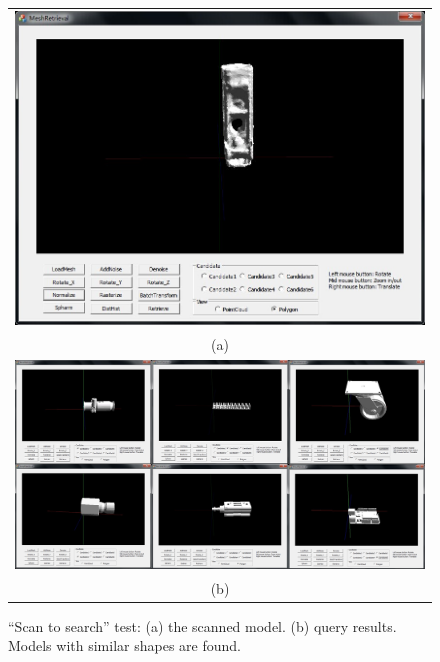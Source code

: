 \begin{figure}
\begin{center}
\begin{tabular}{c}   %
   \includegraphics[height=0.4\columnwidth]{input_component_scantosearch_test}\\
   (a)\\
   \includegraphics[width=0.95\linewidth]{output_component_scantosearch_test}  \\
   (b)\\
\end{tabular}
\caption{``Scan to search'' test: (a) the scanned model. (b) query results.  Models with similar shapes are found. } 
  \label{scantosearchtest_component_UI}
\end{center}
\end{figure}

